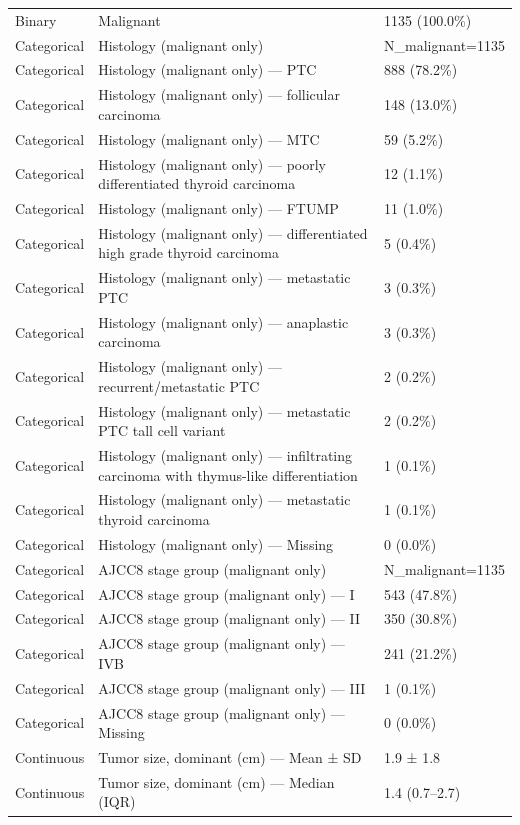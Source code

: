 \begin{table}[htbp]
\begin{tabular}{lll}
Binary & Malignant & 1135 (100.0\%) \\
Categorical & Histology (malignant only) & N\_malignant=1135 \\
Categorical & Histology (malignant only) — PTC & 888 (78.2\%) \\
Categorical & Histology (malignant only) — follicular carcinoma & 148 (13.0\%) \\
Categorical & Histology (malignant only) — MTC & 59 (5.2\%) \\
Categorical & Histology (malignant only) — poorly differentiated thyroid carcinoma & 12 (1.1\%) \\
Categorical & Histology (malignant only) — FTUMP & 11 (1.0\%) \\
Categorical & Histology (malignant only) — differentiated high grade thyroid carcinoma & 5 (0.4\%) \\
Categorical & Histology (malignant only) — metastatic PTC & 3 (0.3\%) \\
Categorical & Histology (malignant only) — anaplastic carcinoma & 3 (0.3\%) \\
Categorical & Histology (malignant only) — recurrent/metastatic PTC & 2 (0.2\%) \\
Categorical & Histology (malignant only) — metastatic PTC tall cell variant & 2 (0.2\%) \\
Categorical & Histology (malignant only) — infiltrating carcinoma with thymus-like differentiation & 1 (0.1\%) \\
Categorical & Histology (malignant only) — metastatic thyroid carcinoma & 1 (0.1\%) \\
Categorical & Histology (malignant only) — Missing & 0 (0.0\%) \\
Categorical & AJCC8 stage group (malignant only) & N\_malignant=1135 \\
Categorical & AJCC8 stage group (malignant only) — I & 543 (47.8\%) \\
Categorical & AJCC8 stage group (malignant only) — II & 350 (30.8\%) \\
Categorical & AJCC8 stage group (malignant only) — IVB & 241 (21.2\%) \\
Categorical & AJCC8 stage group (malignant only) — III & 1 (0.1\%) \\
Categorical & AJCC8 stage group (malignant only) — Missing & 0 (0.0\%) \\
Continuous & Tumor size, dominant (cm) — Mean ± SD & 1.9 ± 1.8 \\
Continuous & Tumor size, dominant (cm) — Median (IQR) & 1.4 (0.7–2.7) \\

\end{tabular}
\end{table}
